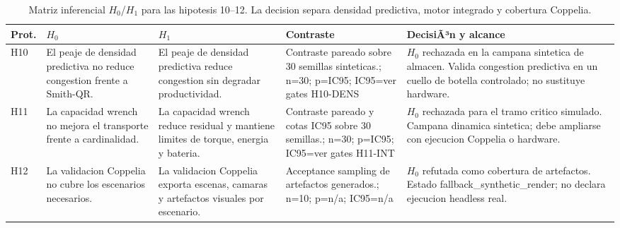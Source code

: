 \begin{table}[H]
\centering
\caption{Matriz inferencial $H_0$/$H_1$ para las hipotesis 10--12. La decision separa densidad predictiva, motor integrado y cobertura Coppelia.}
\label{tab:hypothesis-decision-base-d}
\scriptsize
\begin{tabularx}{\textwidth}{@{}>{\raggedright\arraybackslash}p{}>{\raggedright\arraybackslash}p{}>{\raggedright\arraybackslash}p{}>{\raggedright\arraybackslash}p{}>{\raggedright\arraybackslash}X@{}}
\toprule
Prot. & $H_0$ & $H_1$ & Contraste & DecisiÃ³n y alcance \\
\midrule
H10 & El peaje de densidad predictiva no reduce congestion frente a Smith-QR. & El peaje de densidad predictiva reduce congestion sin degradar productividad. & Contraste pareado sobre 30 semillas sinteticas.; n=30; p=IC95; IC95=ver gates H10-DENS & $H_0$ rechazada en la campana sintetica de almacen. Valida congestion predictiva en un cuello de botella controlado; no sustituye hardware. \\
H11 & La capacidad wrench no mejora el transporte frente a cardinalidad. & La capacidad wrench reduce residual y mantiene limites de torque, energia y bateria. & Contraste pareado y cotas IC95 sobre 30 semillas.; n=30; p=IC95; IC95=ver gates H11-INT & $H_0$ rechazada para el tramo critico simulado. Campana dinamica sintetica; debe ampliarse con ejecucion Coppelia o hardware. \\
H12 & La validacion Coppelia no cubre los escenarios necesarios. & La validacion Coppelia exporta escenas, camaras y artefactos visuales por escenario. & Acceptance sampling de artefactos generados.; n=10; p=n/a; IC95=n/a & $H_0$ refutada como cobertura de artefactos. Estado fallback\_synthetic\_render; no declara ejecucion headless real. \\
\bottomrule
\end{tabularx}
\end{table}

